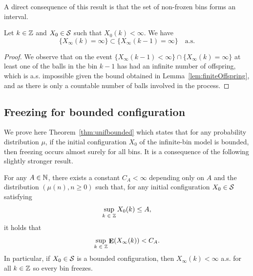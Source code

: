 \documentclass[AHL,Unicode,longabstracts,published]{cedram}
\DeclareMathOperator{\E}{\mathbf{E}}
\newcommand{\bbN}{\mathbb{N}}
\newcommand{\Z}{\mathbb{Z}}
\renewcommand{\S}{\mathcal{S}}
\let\oldin\in
\renewcommand{\in}{\mathchoice{\oldin}{\oldin}{\,\oldin\,}{\,\oldin\,}}
\newcommand{\Z}{\mathbb{Z}}
\begin{document}
A direct consequence of this result is that the set of non-frozen bins forms an interval.

\begin{coro}\label{cor:cascadefinite}
Let $k \in \Z$ and $X_0 \in \S$ such that $X_0(k) < \infty$. We have
\[
\{X_\infty(k) = \infty\} \subset \{X_\infty(k-1) = \infty\}\quad\text{a.s.}
\]
\end{coro}

\begin{proof}
We observe that on the event $\{X_\infty(k-1) < \infty\} \cap \{X_\infty(k) = \infty\}$ at least one of the balls in the bin $k-1$ has had an infinite number of offspring, which is a.s. impossible given the bound obtained in Lemma~\ref{lem:finiteOffspring}, and as there is only a countable number of balls involved in the process.
\end{proof}

\subsection{Freezing for bounded configuration}

We prove here Theorem~\ref{thm:unifbounded} which states that for any probability distribution $\mu$, if the initial configuration $X_0$ of the infinite-bin model is bounded, then freezing occurs almost surely for all bins. It is a consequence of the following slightly stronger result.

\begin{prop}\label{prop:bounded}
For any $A\in \bbN$, there exists a constant $C_A <\infty$ depending only on $A$ and the distribution $(\mu(n), n\geq 0)$ such that, for any initial configuration $X_0 \in \S$ satisfying
\[
\sup_{k \in \Z} X_0(k) \leq A,
\]
it holds that
\begin{equation}\label{eq:unifboundE}
\sup_{k \in \Z} \E(X_\infty(k)) < C_A.
\end{equation}
In particular, if $X_0 \in \S$ is a bounded configuration, then $X_\infty(k) < \infty$ a.s. for all $k\in \Z$ so every bin freezes.
\end{prop}
\end{document}
